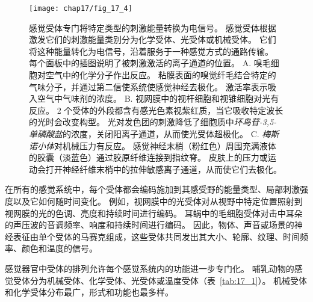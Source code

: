 \begin{figure}[htbp]
	\centering
	\texttt{[image: chap17/fig\_17\_4]}
	\caption{感觉受体专门将特定类型的刺激能量转换为电信号。 
		感觉受体根据激发它们的刺激能量类别分为化学受体、光受体或机械受体。
		它们将这种能量转化为电信号，沿着服务于一种感觉方式的通路传输。
		每个面板中的插图说明了被刺激激活的离子通道的位置。
		A. 嗅毛细胞对空气中的化学分子作出反应。
		粘膜表面的嗅觉纤毛结合特定的气味分子，并通过第二信使系统使感觉神经去极化。
		激活率表示吸入空气中气味剂的浓度。
		B. 视网膜中的视杆细胞和视锥细胞对光有反应。
		2 个受体的外段都含有感光色素视紫红质，当它吸收特定波长的光时会改变构型。
		光对发色团的刺激降低了细胞质中\textit{环鸟苷-3,5-单磷酸盐}的浓度，关闭阳离子通道，从而使光受体超极化。
		C. \textit{梅斯诺小体}对机械压力有反应。 
		感觉神经末梢（粉红色）周围充满液体的胶囊（淡蓝色）通过胶原纤维连接到指纹脊。
		皮肤上的压力或运动会打开神经纤维末梢中的拉伸敏感离子通道，从而使它们去极化\cite{albe1973morphology}。}
	\label{fig:17_4}
\end{figure}


在所有的感觉系统中，每个受体都会编码施加到其感受野的能量类型、局部刺激强度以及它如何随时间变化。
例如，视网膜中的光受体对从视野中特定位置照射到视网膜的光的色调、亮度和持续时间进行编码。
耳蜗中的毛细胞受体对击中耳朵的声压波的音调频率、响度和持续时间进行编码。
因此，物体、声音或场景的神经表征由单个受体的马赛克组成，这些受体共同发出其大小、轮廓、纹理、时间频率、颜色和温度的信号。


感觉器官中受体的排列允许每个感觉系统内的功能进一步专门化。 
哺乳动物的感觉受体分为机械受体、化学受体、光受体或温度受体（表~\ref{tab:17_1}）。
机械受体和化学受体分布最广，形式和功能也最多样。


